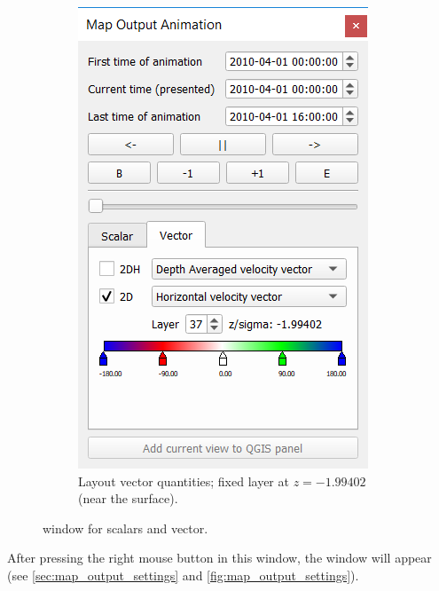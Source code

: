 \documentclass{deltares_memo}
\begin{document}
\begin{figure}[H]
\begin{subfigure}[b]{0.48\textwidth}
\end{subfigure}
\hfill
\begin{subfigure}[b]{0.48\textwidth}
	\centering
	\includegraphics[width=\textwidth]{pictures/map_output_animation_window_vector.png}
	\caption{Layout vector quantities; fixed layer at $z = -1.99402$ (near the surface).}
\end{subfigure}
    \caption{ window for scalars and vector.}
\end{figure}

After pressing the right mouse button in this window, the window  will appear (see  \autoref{sec:map_output_settings} and \autoref{fig:map_output_settings}).
\end{document}
